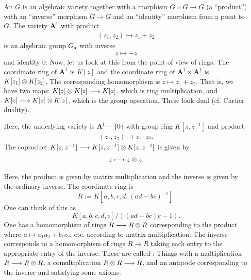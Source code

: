 \documentclass [11 pt, oneside] {article}
\begin{document}
\begin{example}\label{}
An  $G$ is an algebraic variety together with a morphism $G\times G\longrightarrow G$ (a ``product'') with an ``inverse'' morphism $G\longrightarrow G$ and an ``identity'' morphism from a point to $G$. The variety $\mathbf{A}^1$ with product
\begin{align*}
	(z_1,z_2)\longmapsto z_1+z_2
\end{align*}
is an algebraic group $G\textsubscript{a}$ with inverse
\begin{align*}
	z\longmapsto -z
\end{align*}
and identity $0$. Now, let us look at this from the point of view of rings. The coordinate ring of $\mathbf{A}^1$ is $K[z]$ and the coordinate ring of $\mathbf{A}^1\times \mathbf{A}^1$ is $K[z_1]\otimes K[z_2]$. The corresponding homomorphism is $z\longmapsto z_1+z_2$. That is, we have two maps: $K[z]\otimes K[z]\longrightarrow K[z]$, which is ring multiplication, and $K[z]\longrightarrow K[z]\otimes K[z]$, which is the group operation. These look dual (cf. Cartier duality).
\end{example}

\begin{example}\label{}
Here, the underlying variety is $\mathbf{A}^1 - \{0\}$ with group ring $K[z,z^{-1}]$ and product 
\begin{align*}
	(z_1,z_2)\longmapsto z_1\cdot z_2.
\end{align*}
The coproduct $K[z,z^{-1}] \longrightarrow K[z,z^{-1}]\otimes K[z,z^{-1}]$ is given by 
\begin{align*}
	z\longmapsto z\otimes z.
\end{align*}
\end{example}

\begin{example}[$\GL_2(K)$]\label{}
Here, the product is given by matrix multiplication and the inverse is given by the ordinary inverse. The coordinate ring is 
\[
	R:=K[a,b,c,d,(ad-bc) ^{-1}].
\] 
One can think of this as 
\[
	{K[a,b,c,d,e]}/{((ad-bc)e-1)}.
\] 
One has a homomorphism of rings $R\longrightarrow R\otimes R$ corresponding to the product where $a\longmapsto a_1a_2+b_1c_2$, etc. according to matrix multiplication. The inverse corresponds to a homomorphism of rings $R\longrightarrow R$ taking each entry to the appropriate entry of the inverse. These are called : Things with a multiplication $R \longrightarrow  R\otimes R$, a comultiplication $R\otimes R\longrightarrow R$, and an antipode corresponding to the inverse and satisfying some axioms.
\end{example}
\end{document}
